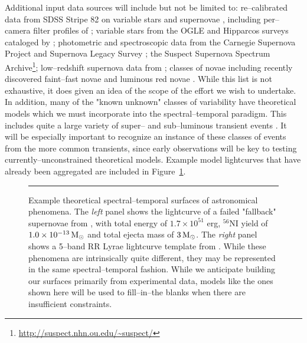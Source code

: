 Additional input data sources will include but not be limited to: re--calibrated
data from SDSS Stripe 82 on variable stars \citep{2010ApJ...708..717S} and
supernovae \citep{2008AJ....136.2306H,2011ApJ...738..162S}, including
per--camera filter profiles of \cite{2007AJ....134..973I}; variable stars from
the OGLE and Hipparcos surveys cataloged by \cite{2007A&A...475.1159D};
photometric and spectroscopic data from the Carnegie Supernova Project
\citep[e.g.][]{2010AJ....139..519C} and Supernova Legacy Survey
\citep[e.g.][]{2011yCat..74101262W}; the Suspect Supernova Spectrum
Archive\footnote{\url{http://suspect.nhn.ou.edu/~suspect/}}; low--redshift
supernova data from \cite{2006AJ....131..527J}; classes of novae including
recently discovered faint--fast novae \citep{2011ApJ...735...94K} and luminous
red novae \citep{2011ApJ...730..134K}.  While this list is not exhaustive, it
does given an idea of the scope of the effort we wish to undertake.  In
addition, many of the "known unknown" classes of variability have theoretical
models which we must incorporate into the spectral--temporal paradigm.  This
includes quite a large variety of super-- and sub--luminous transient events
\citep[e.g.][]{2010ApJ...715..767S,2009ApJ...707..193F}.  It will be especially
important to recognize an instance of these classes of events from the more
common transients, since early observations will be key to testing
currently--unconstrained theoretical models.  Example model lightcurves that
have already been aggregated are included in Figure~\ref{fig:sts}.

\begin{figure}[t]
\centerline{ \hfil
{}} \smallskip
\caption[]{\footnotesize Example theoretical spectral--temporal surfaces of
astronomical phenomena.  The {\it left} panel shows the lightcurve of a failed
"fallback" supernovae from \cite{2009ApJ...707..193F}, with total energy of $1.7
\times 10^{51}$ erg, $^{56}$NI yield of $1.0 \times 10^{-13} {\rm\,M_\odot}$ and total
ejecta mass of $3 {\rm\,M_\odot}$.  The {\it right} panel shows a 5--band RR Lyrae
lightcurve template from \cite{2010ApJ...708..717S}.  While these phenomena are
intrinsically quite different, they may be represented in the same
spectral--temporal fashion.  While we anticipate building our surfaces primarily
from experimental data, models like the ones shown here will be used to
fill--in--the blanks when there are insufficient constraints.} \medskip \hrule
\label{fig:sts} \end{figure}

